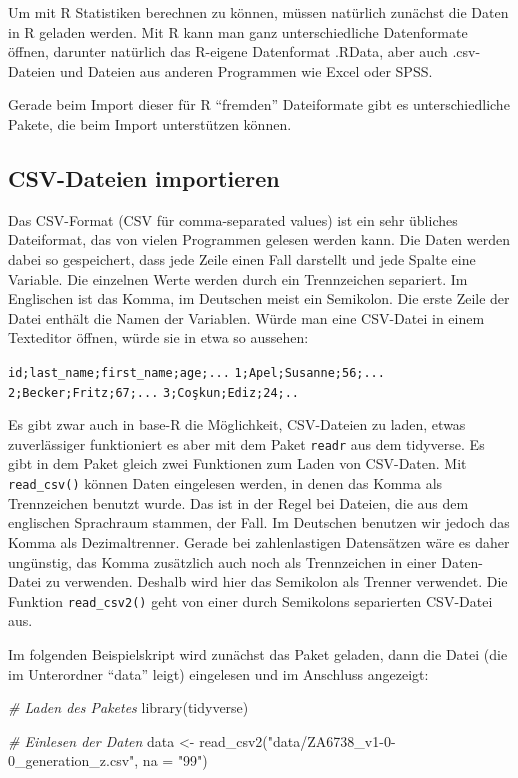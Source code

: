 \documentclass[
]{book}
\newenvironment{Shaded}{\begin{snugshade}}{\end{snugshade}}
\newcommand{\AttributeTok}[1]{\textcolor[rgb]{0.77,0.63,0.00}{#1}}
\newcommand{\CommentTok}[1]{\textcolor[rgb]{0.56,0.35,0.01}{\textit{#1}}}
\newcommand{\FunctionTok}[1]{\textcolor[rgb]{0.00,0.00,0.00}{#1}}
\newcommand{\NormalTok}[1]{#1}
\newcommand{\OtherTok}[1]{\textcolor[rgb]{0.56,0.35,0.01}{#1}}
\newcommand{\StringTok}[1]{\textcolor[rgb]{0.31,0.60,0.02}{#1}}
\begin{document}
Um mit R Statistiken berechnen zu können, müssen natürlich zunächst die Daten in R geladen werden. Mit R kann man ganz unterschiedliche Datenformate öffnen, darunter natürlich das R-eigene Datenformat .RData, aber auch .csv-Dateien und Dateien aus anderen Programmen wie Excel oder SPSS.

Gerade beim Import dieser für R ``fremden'' Dateiformate gibt es unterschiedliche Pakete, die beim Import unterstützen können.

\hypertarget{csv-dateien-importieren}{%
\subsection{CSV-Dateien importieren}\label{csv-dateien-importieren}}

Das CSV-Format (CSV für comma-separated values) ist ein sehr übliches Dateiformat, das von vielen Programmen gelesen werden kann. Die Daten werden dabei so gespeichert, dass jede Zeile einen Fall darstellt und jede Spalte eine Variable. Die einzelnen Werte werden durch ein Trennzeichen separiert. Im Englischen ist das Komma, im Deutschen meist ein Semikolon. Die erste Zeile der Datei enthält die Namen der Variablen. Würde man eine CSV-Datei in einem Texteditor öffnen, würde sie in etwa so aussehen:

\texttt{id;last\_name;first\_name;age;...}
\texttt{1;Apel;Susanne;56;...}
\texttt{2;Becker;Fritz;67;...}
\texttt{3;Coşkun;Ediz;24;..}

Es gibt zwar auch in base-R die Möglichkeit, CSV-Dateien zu laden, etwas zuverlässiger funktioniert es aber mit dem Paket \texttt{readr} aus dem tidyverse. Es gibt in dem Paket gleich zwei Funktionen zum Laden von CSV-Daten. Mit \texttt{read\_csv()} können Daten eingelesen werden, in denen das Komma als Trennzeichen benutzt wurde. Das ist in der Regel bei Dateien, die aus dem englischen Sprachraum stammen, der Fall. Im Deutschen benutzen wir jedoch das Komma als Dezimaltrenner. Gerade bei zahlenlastigen Datensätzen wäre es daher ungünstig, das Komma zusätzlich auch noch als Trennzeichen in einer Daten-Datei zu verwenden. Deshalb wird hier das Semikolon als Trenner verwendet. Die Funktion \texttt{read\_csv2()} geht von einer durch Semikolons separierten CSV-Datei aus.

Im folgenden Beispielskript wird zunächst das Paket geladen, dann die Datei (die im Unterordner ``data'' leigt) eingelesen und im Anschluss angezeigt:

\begin{Shaded}
\begin{Highlighting}[]
\CommentTok{\# Laden des Paketes}
\FunctionTok{library}\NormalTok{(tidyverse)}

\CommentTok{\# Einlesen der Daten}
\NormalTok{data }\OtherTok{\textless{}{-}} \FunctionTok{read\_csv2}\NormalTok{(}\StringTok{"data/ZA6738\_v1{-}0{-}0\_generation\_z.csv"}\NormalTok{, }\AttributeTok{na =} \StringTok{"99"}\NormalTok{)}
\end{Highlighting}
\end{Shaded}
\end{document}
